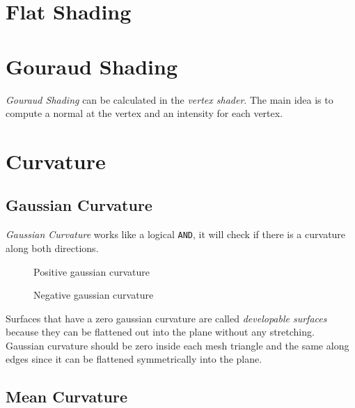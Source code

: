\section{Flat Shading}

\section{Gouraud Shading}
\textit{Gouraud Shading} can be calculated in the \textit{vertex shader}. The main idea is to compute a normal at the vertex and an intensity for each vertex.

\section{Curvature}
\subsection{Gaussian Curvature}
\textit{Gaussian Curvature} works like a logical \texttt{AND}, it will check if there is a curvature along both directions.

\begin{figure}[h]
  \centering
  \caption{Positive gaussian curvature}\label{fig:positive-gaussian}
  \endminipage
  \centering
  \caption{Negative gaussian curvature}\label{fig:negative-gaussian}
  \endminipage
\end{figure}
Surfaces that have a zero gaussian curvature are called \textit{developable surfaces} because they can be flattened out into the plane without any stretching. Gaussian curvature should be zero inside each mesh triangle and the same along edges since it can be flattened symmetrically into the plane.

\subsection{Mean Curvature}



